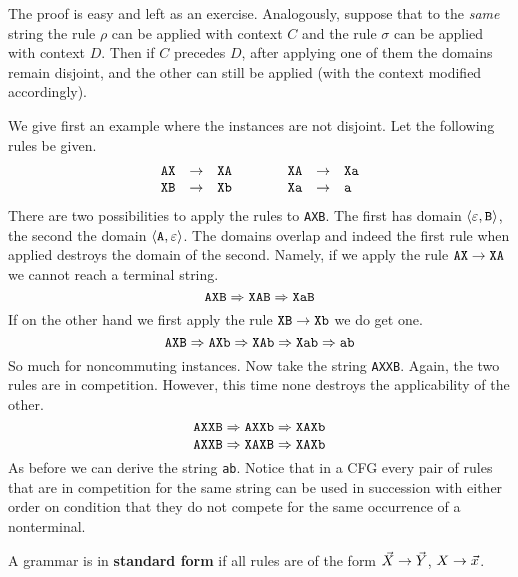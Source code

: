 The proof is easy and left as an exercise. Analogously, suppose that
to the {\it same\/} string the rule $\rho$ can be applied with context 
$C$ and the rule $\sigma$ can be applied with context $D$. Then if 
$C$ precedes $D$, after applying one of them the domains remain 
disjoint, and the other can still be applied (with the context modified 
accordingly).

We give first an example where the instances are not disjoint. Let the 
following rules be given.
\begin{equation}
\begin{array}{l@{\quad\pf\quad}l@{\qquad\qquad}l@{\quad\pf\quad}l}
\mbox{\tt AX} & \mbox{\tt XA} & \mbox{\tt XA} & \mbox{\tt Xa} \\
\mbox{\tt XB} & \mbox{\tt Xb} & \mbox{\tt Xa} & \mbox{\tt a}
\end{array}
\end{equation}
There are two possibilities to apply the rules to {\tt AXB}.
The first has domain $\langle \varepsilon, \mbox{\tt B}\rangle$,
the second the domain $\langle \mbox{\tt A}, \varepsilon\rangle$. The
domains overlap and indeed the first rule when applied destroys
the domain of the second. Namely, if we apply the rule
$\mbox{\tt AX} \rightarrow \mbox{\tt XA}$ we cannot reach a terminal
string.
\begin{equation}
\mbox{\tt AXB} \Rightarrow \mbox{\tt XAB} \Rightarrow \mbox{\tt XaB}
\end{equation}
If on the other hand we first apply the rule 
$\mbox{\tt XB} \rightarrow \mbox{\tt Xb}$ we do get one.
\begin{equation}
\mbox{\tt AXB} \Rightarrow \mbox{\tt AXb} \Rightarrow \mbox{\tt XAb}
 \Rightarrow \mbox{\tt Xab} \Rightarrow \mbox{\tt ab}
\end{equation}
So much for noncommuting instances. Now take the string {\tt AXXB}.
Again, the two rules are in competition. However, this time none
destroys the applicability of the other.
\begin{equation}
\mbox{\tt AXXB} \Rightarrow \mbox{\tt AXXb} \Rightarrow \mbox{\tt XAXb}
\end{equation}
\begin{equation}
\mbox{\tt AXXB} \Rightarrow \mbox{\tt XAXB} \Rightarrow \mbox{\tt XAXb}
\end{equation}
As before we can derive the string {\tt ab}.
Notice that in a CFG every pair of rules that are
in competition for the same string can be used in succession
with either order on condition that they do not compete for the
same occurrence of a nonterminal.
\begin{defn}
A grammar is in \textbf{standard form} if all rules are of the
form $\vec{X} \rightarrow \vec{Y}$, $X \rightarrow \vec{x}$.
\end{defn}
